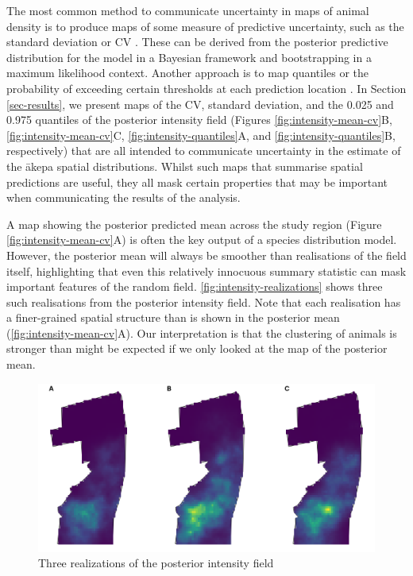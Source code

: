 \documentclass{statsoc}
\newcommand{\akepa}{\textquotesingle\={a}kepa}  %
\begin{document}
The most common method to communicate uncertainty in maps of animal density is to produce maps of some measure of predictive uncertainty, such as the standard deviation or CV \citep{fuller_novel_2018, vallejo_responses_2017,bradbury_mapping_2014}.  These can be derived from the posterior predictive distribution for the model in a Bayesian framework and bootstrapping in a maximum likelihood context.  Another approach is to map quantiles or the probability of exceeding certain thresholds at each prediction location \citep{russell_avoidance_2016, wilson_hierarchical_2010}.  In Section \ref{sec-results}, we present maps of the CV, standard deviation, and the 0.025 and 0.975 quantiles of the posterior intensity field (Figures \ref{fig:intensity-mean-cv}B, \ref{fig:intensity-mean-cv}C, \ref{fig:intensity-quantiles}A, and \ref{fig:intensity-quantiles}B, respectively) that are all intended to communicate uncertainty in the estimate of the \akepa{} spatial distributions.  Whilst such maps that summarise spatial predictions are useful, they all mask certain properties that may be important when communicating the results of the analysis. 

A map showing the posterior predicted mean across the study region (Figure \ref{fig:intensity-mean-cv}A) is often the key output of a species distribution model.  However, the posterior mean will always be smoother than realisations of the field itself, highlighting that even this relatively innocuous summary statistic can mask important features of the random field.  \autoref{fig:intensity-realizations} shows three such realisations from the posterior intensity field.  Note that each realisation has a finer-grained spatial structure than is shown in the posterior mean (\autoref{fig:intensity-mean-cv}A).  Our interpretation is that the clustering of animals is stronger than might be expected if we only looked at the map of the posterior mean.
\begin{figure}[!htb]
	\includegraphics[scale=0.525]{figures/intensity_realized.png}
	\caption{Three realizations of the posterior intensity field}
	\label{fig:intensity-realizations}
\end{figure}
\end{document}

